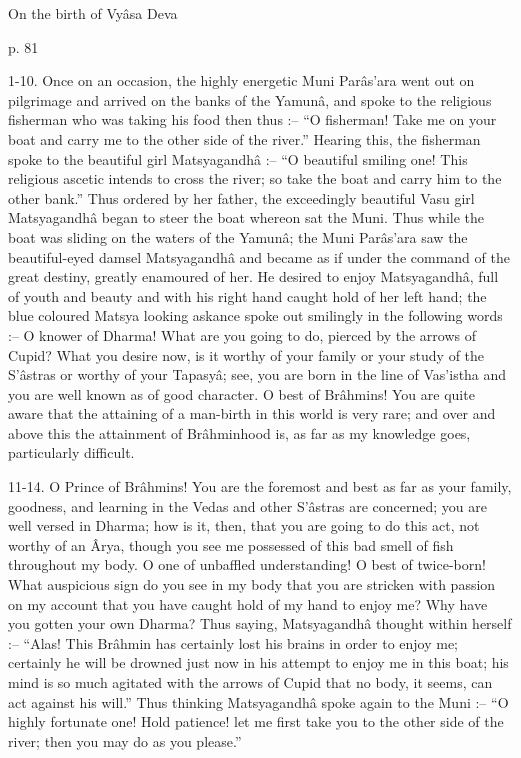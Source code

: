 ﻿On the birth of Vyâsa Deva

 

p. 81

 

1-10. Once on an occasion, the highly energetic Muni Parâs'ara went out on pilgrimage and arrived on the banks of the Yamunâ, and spoke to the religious fisherman who was taking his food then thus :-- “O fisherman! Take me on your boat and carry me to the other side of the river.” Hearing this, the fisherman spoke to the beautiful girl Matsyagandhâ :-- “O beautiful smiling one! This religious ascetic intends to cross the river; so take the boat and carry him to the other bank.” Thus ordered by her father, the exceedingly beautiful Vasu girl Matsyagandhâ began to steer the boat whereon sat the Muni. Thus while the boat was sliding on the waters of the Yamunâ; the Muni Parâs'ara saw the beautiful-eyed damsel Matsyagandhâ and became as if under the command of the great destiny, greatly enamoured of her. He desired to enjoy Matsyagandhâ, full of youth and beauty and with his right hand caught hold of her left hand; the blue coloured Matsya looking askance spoke out smilingly in the following words :-- O knower of Dharma! What are you going to do, pierced by the arrows of Cupid? What you desire now, is it worthy of your family or your study of the S’âstras or worthy of your Tapasyâ; see, you are born in the line of Vas'istha and you are well known as of good character. O best of Brâhmins! You are quite aware that the attaining of a man-birth in this world is very rare; and over and above this the attainment of Brâhminhood is, as far as my knowledge goes, particularly difficult.

 

11-14. O Prince of Brâhmins! You are the foremost and best as far as your family, goodness, and learning in the Vedas and other S’âstras are concerned; you are well versed in Dharma; how is it, then, that you are going to do this act, not worthy of an Ârya, though you see me possessed of this bad smell of fish throughout my body. O one of unbaffled understanding! O best of twice-born! What auspicious sign do you see in my body that you are stricken with passion on my account that you have caught hold of my hand to enjoy me? Why have you gotten your own Dharma? Thus saying, Matsyagandhâ thought within herself :-- “Alas! This Brâhmin has certainly lost his brains in order to enjoy me; certainly he will be drowned just now in his attempt to enjoy me in this boat; his mind is so much agitated with the arrows of Cupid that no body, it seems, can act against his will.” Thus thinking Matsyagandhâ spoke again to the Muni :-- “O highly fortunate one! Hold patience! let me first take you to the other side of the river; then you may do as you please.”

